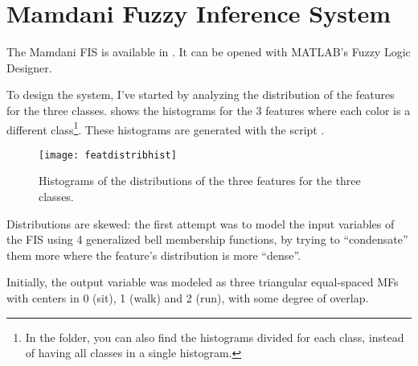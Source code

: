 \section{Mamdani Fuzzy Inference System}\label{sec:fuzzymamdani}

The Mamdani FIS is available in . It can be opened with
MATLAB's Fuzzy Logic Designer.

To design the system, I've started by analyzing the distribution of the
features for the three classes.  shows the
histograms for the 3 features where each color is a different class\footnote{In
the  folder, you can also find the histograms divided for each
class, instead of having all classes in a single histogram.}. These histograms
are generated with the script .

\begin{figure}[htbp]
	\centering
	\texttt{[image: featdistribhist]}
	\caption{Histograms of the distributions of the three features for the
	three classes.}\label{fig:featdistribhist}
\end{figure}

Distributions are skewed: the first attempt was to model the input variables of
the FIS using 4 generalized bell membership functions, by trying to
``condensate'' them more where the feature's distribution is more ``dense''.

Initially, the output variable was modeled as three triangular equal-spaced MFs
with centers in 0 (sit), 1 (walk) and 2 (run), with some degree of overlap.

